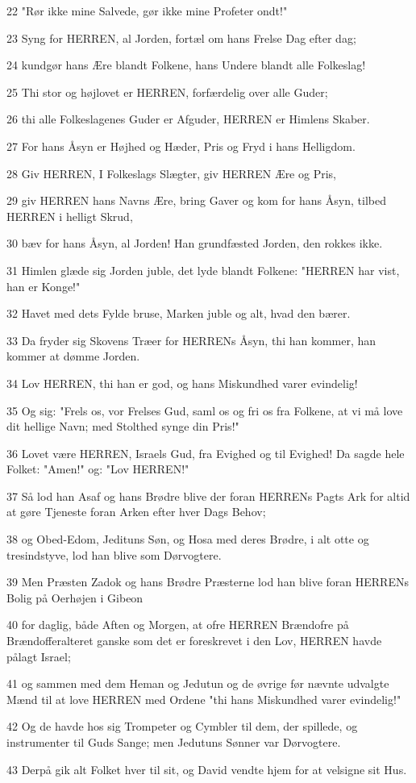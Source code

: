 \par 22 "Rør ikke mine Salvede, gør ikke mine Profeter ondt!"
\par 23 Syng for HERREN, al Jorden, fortæl om hans Frelse Dag efter dag;
\par 24 kundgør hans Ære blandt Folkene, hans Undere blandt alle Folkeslag!
\par 25 Thi stor og højlovet er HERREN, forfærdelig over alle Guder;
\par 26 thi alle Folkeslagenes Guder er Afguder, HERREN er Himlens Skaber.
\par 27 For hans Åsyn er Højhed og Hæder, Pris og Fryd i hans Helligdom.
\par 28 Giv HERREN, I Folkeslags Slægter, giv HERREN Ære og Pris,
\par 29 giv HERREN hans Navns Ære, bring Gaver og kom for hans Åsyn, tilbed HERREN i helligt Skrud,
\par 30 bæv for hans Åsyn, al Jorden! Han grundfæsted Jorden, den rokkes ikke.
\par 31 Himlen glæde sig Jorden juble, det lyde blandt Folkene: "HERREN har vist, han er Konge!"
\par 32 Havet med dets Fylde bruse, Marken juble og alt, hvad den bærer.
\par 33 Da fryder sig Skovens Træer for HERRENs Åsyn, thi han kommer, han kommer at dømme Jorden.
\par 34 Lov HERREN, thi han er god, og hans Miskundhed varer evindelig!
\par 35 Og sig: "Frels os, vor Frelses Gud, saml os og fri os fra Folkene, at vi må love dit hellige Navn; med Stolthed synge din Pris!"
\par 36 Lovet være HERREN, Israels Gud, fra Evighed og til Evighed! Da sagde hele Folket: "Amen!" og: "Lov HERREN!"
\par 37 Så lod han Asaf og hans Brødre blive der foran HERRENs Pagts Ark for altid at gøre Tjeneste foran Arken efter hver Dags Behov;
\par 38 og Obed-Edom, Jedituns Søn, og Hosa med deres Brødre, i alt otte og tresindstyve, lod han blive som Dørvogtere.
\par 39 Men Præsten Zadok og hans Brødre Præsterne lod han blive foran HERRENs Bolig på Oerhøjen i Gibeon
\par 40 for daglig, både Aften og Morgen, at ofre HERREN Brændofre på Brændofferalteret ganske som det er foreskrevet i den Lov, HERREN havde pålagt Israel;
\par 41 og sammen med dem Heman og Jedutun og de øvrige før nævnte udvalgte Mænd til at love HERREN med Ordene "thi hans Miskundhed varer evindelig!"
\par 42 Og de havde hos sig Trompeter og Cymbler til dem, der spillede, og instrumenter til Guds Sange; men Jedutuns Sønner var Dørvogtere.
\par 43 Derpå gik alt Folket hver til sit, og David vendte hjem for at velsigne sit Hus.


